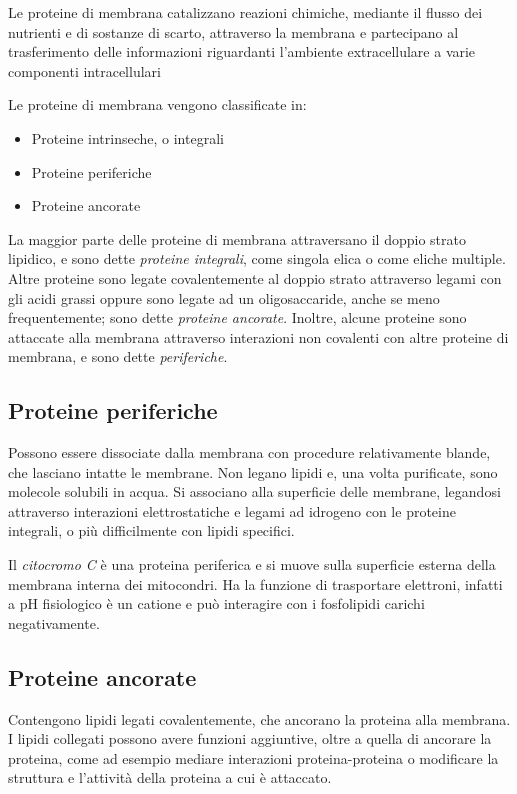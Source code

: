Le proteine di membrana catalizzano reazioni chimiche, mediante il flusso dei nutrienti e di sostanze di scarto, attraverso la membrana e partecipano al trasferimento delle informazioni riguardanti l'ambiente extracellulare a varie componenti intracellulari

Le proteine di membrana vengono classificate in:
\begin{itemize}
\item Proteine intrinseche, o integrali
\item Proteine periferiche
\item Proteine ancorate
\end{itemize}

La maggior parte delle proteine di membrana attraversano il doppio strato lipidico, e sono dette \emph{proteine integrali}, come singola elica o come eliche multiple. Altre proteine sono legate covalentemente al doppio strato attraverso legami con gli acidi grassi oppure sono legate ad un oligosaccaride, anche se meno frequentemente; sono dette \emph{proteine ancorate}. Inoltre, alcune proteine sono attaccate alla membrana attraverso interazioni non covalenti con altre proteine di membrana, e sono dette \emph{periferiche}.

\subsection{Proteine periferiche}

Possono essere dissociate dalla membrana con procedure relativamente blande, che lasciano intatte le membrane. Non legano lipidi e, una volta purificate, sono molecole solubili in acqua.
Si associano alla superficie delle membrane, legandosi attraverso interazioni elettrostatiche e legami ad idrogeno con le proteine integrali, o più difficilmente con lipidi specifici.

Il \emph{citocromo C} è una proteina periferica e si muove sulla superficie esterna della membrana interna dei mitocondri. Ha la funzione di trasportare elettroni, infatti a pH fisiologico è un catione e può interagire con i fosfolipidi carichi negativamente.


\subsection{Proteine ancorate}

Contengono lipidi legati covalentemente, che ancorano la proteina alla membrana. I lipidi collegati possono avere funzioni aggiuntive, oltre a quella di ancorare la proteina, come ad esempio mediare interazioni proteina-proteina o modificare la struttura e l'attività della proteina a cui è attaccato.

